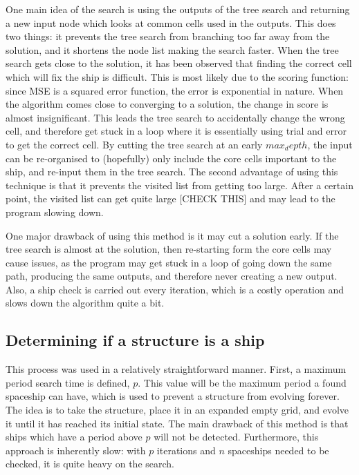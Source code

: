 \documentclass{l4proj}
\begin{document}
One main idea of the search is using the outputs of the tree search and returning a new input node which looks at common cells used in the outputs. This does two things: it prevents the tree search from branching too far away from the solution, and it shortens the node list making the search faster. When the tree search gets close to the solution, it has been observed that finding the correct cell which will fix the ship is difficult. This is most likely due to the scoring function: since MSE is a squared error function, the error is exponential in nature. When the algorithm comes close to converging to a solution, the change in score is almost insignificant. This leads the tree search to accidentally change the wrong cell, and therefore get stuck in a loop where it is essentially using trial and error to get the correct cell. By cutting the tree search at an early $max_depth$, the input can be re-organised to (hopefully) only include the core cells important to the ship, and re-input them in the tree search. The second advantage of using this technique is that it prevents the visited list from getting too large. After a certain point, the visited list can get quite large [CHECK THIS] and may lead to the program slowing down. 

One major drawback of using this method is it may cut a solution early. If the tree search is almost at the solution, then re-starting form the core cells may cause issues, as the program may get stuck in a loop of going down the same path, producing the same outputs, and therefore never creating a new output. Also, a ship check is carried out every iteration, which is a costly operation and slows down the algorithm quite a bit.


\subsection{Determining if a structure is a ship}

This process was used in a relatively straightforward manner. First, a maximum period search time is defined, $p$. This value will be the maximum period a found spaceship can have, which is used to prevent a structure from evolving forever. The idea is to take the structure, place it in an expanded empty grid, and evolve it until it has reached its initial state. The main drawback of this method is that ships which have a period above $p$ will not be detected. Furthermore, this approach is inherently slow: with $p$ iterations and $n$ spaceships needed to be checked, it is quite heavy on the search.
\end{document}
